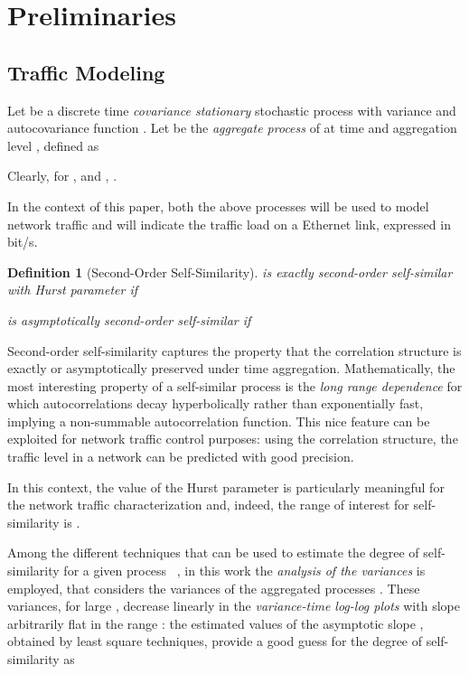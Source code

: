 \documentclass[journal,10pt,twoside,final]{IEEEtran}
\newtheorem{definition}{Definition}
\begin{document}
\section{Preliminaries}
\label{sec:preliminaries}
\subsection{Traffic Modeling}

Let  be a discrete time \textit{covariance stationary} stochastic process with variance  and autocovariance function . Let  be the \textit{aggregate process} of  at time  and aggregation level , defined as

Clearly, for ,  and , .

In the context of this paper, both the above processes will be used to model network traffic and will indicate the traffic load on a Ethernet link, expressed in bit/s. 
\begin{definition}[Second-Order Self-Similarity] 
 is exactly second-order self-similar with Hurst parameter  if
  
 is asymptotically second-order self-similar if

\end{definition}

\vspace{0.3cm}

Second-order self-similarity captures the property that the correlation structure is exactly or asymptotically preserved under time aggregation. 
Mathematically, the most interesting property of a self-similar process is the \textit{long range dependence} for which autocorrelations decay hyperbolically rather than exponentially fast, implying a non-summable autocorrelation function. This nice feature can be exploited for network traffic control purposes: using the correlation structure, the traffic level in a network can be predicted with good precision.

In this context, the value of the Hurst parameter  is particularly meaningful for the network traffic characterization and, indeed, the range of interest for self-similarity is . 

Among the different techniques that can be used to estimate the degree of self-similarity  for a given process ~\cite{LelandTaqquWillinger94}, in this work the \textit{analysis of the variances} is employed, that considers the variances of the aggregated processes .
These variances, for large , decrease linearly  in the \textit{variance-time log-log plots} with slope  arbitrarily flat in the range : the estimated values of the asymptotic slope , obtained by least square techniques, provide a good guess for the degree of self-similarity as~\cite{LelandTaqquWillinger94} 
\end{document}
